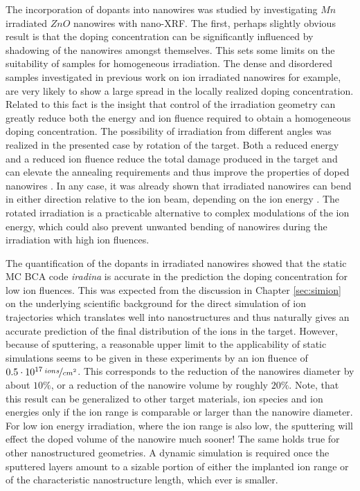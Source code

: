 The incorporation of dopants into nanowires was studied by investigating $Mn$ irradiated $ZnO$ nanowires with nano-XRF. The first, perhaps slightly obvious result is that the doping concentration can be significantly influenced by shadowing of the nanowires amongst themselves. This sets some limits on the suitability of samples for homogeneous irradiation. The dense and disordered samples investigated in previous work on ion irradiated nanowires \cite{geburt_rare_2008,ronning_ion_2010,kaiser_defect_2011,geburt_lasing_2012,geburt_intense_2013,kaiser_luminescence_2013,geburt_intense_2014,chu_nano-x-ray_2014} for example, are very likely to show a large spread in the locally realized doping concentration. Related to this fact is the insight that control of the irradiation geometry can greatly reduce both the energy and ion fluence required to obtain a homogeneous doping concentration. The possibility of irradiation from different angles was realized in the presented case by rotation of the target. Both a reduced energy and a reduced ion fluence reduce the total damage produced in the target and can elevate the annealing requirements and thus improve the properties of doped nanowires \cite{borschel_new_2011,paschoal_hopping_2012,borschel_ion-solid_2012,kumar_magnetic_2013,paschoal_magnetoresistance_2014}. In any case, it was already shown that irradiated nanowires can bend in either direction relative to the ion beam, depending on the ion energy \cite{borschel_permanent_2011}. The rotated irradiation is a practicable alternative to complex modulations of the ion energy, which could also prevent unwanted bending of nanowires during the irradiation with high ion fluences.

The quantification of the dopants in irradiated nanowires showed that the static MC BCA code \emph{iradina} is accurate in the prediction the doping concentration for low ion fluences. This was expected from the discussion in Chapter \ref{sec:simion} on the underlying scientific background for the direct simulation of ion trajectories which translates well into nanostructures and thus naturally gives an accurate prediction of the final distribution of the ions in the target. However, because of sputtering, a reasonable upper limit to the applicability of static simulations seems to be given in these experiments by an ion fluence of $0.5\cdot 10^{17}\,\nicefrac{ions}{cm^2}$. This corresponds to the reduction of the nanowires diameter by about $10\%$, or a reduction of the nanowire volume by roughly $20\%$. Note, that this result can be generalized to other target materials, ion species and ion energies only if the ion range is comparable or larger than the nanowire diameter. For low ion energy irradiation, where the ion range is also low, the sputtering will effect the doped volume of the nanowire much sooner! The same holds true for other nanostructured geometries. A dynamic simulation is required once the sputtered layers amount to a sizable portion of either the implanted ion range or of the characteristic nanostructure length, which ever is smaller. 

